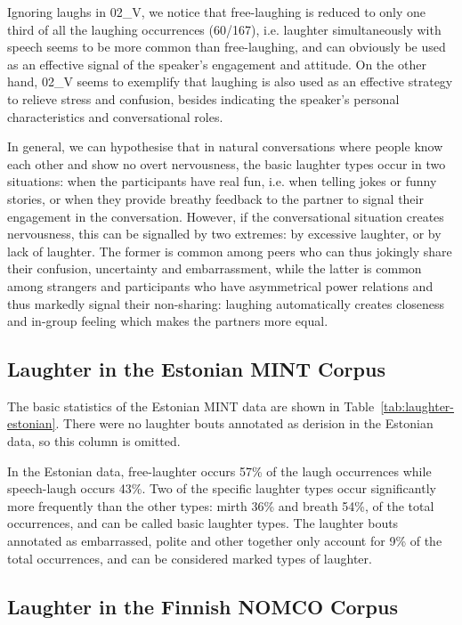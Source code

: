 \documentclass[10pt,journal,compsoc]{IEEEtran}
\begin{document}
Ignoring laughs in 02\_V, we notice that free-laughing is reduced to only one third of all the laughing occurrences (60/167), i.e. laughter simultaneously with speech seems to be more common than free-laughing, and can obviously be used as an effective signal of the speaker's engagement and attitude. On the other hand, 02\_V seems to exemplify that laughing is also used as an effective strategy to relieve stress and confusion, besides indicating the speaker's personal characteristics and conversational roles.

In general, we can hypothesise that in natural conversations where people know each other and show no overt nervousness, the basic laughter types occur in two situations: when the participants have real fun, i.e. when telling jokes or funny stories, or when they provide breathy feedback to the partner to signal their engagement in the conversation. However, if the conversational situation creates nervousness, this can be signalled by two extremes: by excessive laughter, or by lack of laughter. The former is common among peers who can thus jokingly share their confusion, uncertainty and embarrassment, while the latter is common among strangers and participants who have asymmetrical power relations and thus markedly signal their non-sharing: laughing automatically creates closeness and in-group feeling which makes the partners more equal.

\subsection{Laughter in the Estonian MINT Corpus}

The basic statistics of the Estonian MINT data are shown in Table~\ref{tab:laughter-estonian}.
There were no laughter bouts annotated as derision in the Estonian data, so this column is omitted.

In the Estonian data, free-laughter occurs 57\% of the laugh occurrences while speech-laugh occurs 43\%. Two of the specific laughter types occur significantly more frequently than the other types: mirth 36\% and breath 54\%, of the total occurrences, and can be called basic laughter types. The laughter bouts annotated as embarrassed, polite and other together only account for 9\% of the total occurrences, and can be considered marked types of laughter.

\subsection{Laughter in the Finnish NOMCO Corpus}
\end{document}

